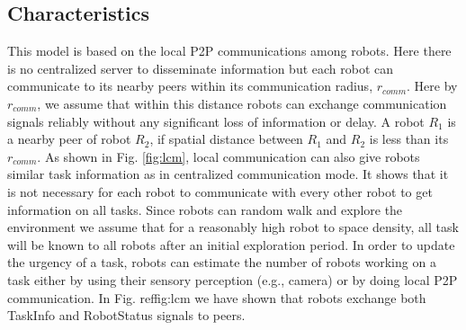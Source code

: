 \documentclass[letterpaper, 10 pt, conference]{ieeeconf}  %
\begin{document}
\subsection{Characteristics}
This model is based on the local P2P communications among robots. Here there is no centralized server to disseminate information but each robot can communicate to its nearby peers within its communication radius, $r_{comm}$. Here by $r_{comm}$, we assume that within this distance robots can exchange communication signals reliably without any significant loss of information or delay. A robot $R_1$ is a nearby peer  of robot $R_2$, if spatial distance between $R_1$ and $R_2$ is less than its $r_{comm}$. As shown in Fig. \ref{fig:lcm}, local communication can also give robots similar task information as in centralized communication mode. It shows that  it is not necessary for each robot to communicate with every other robot to get information on all tasks. Since robots can random walk  and explore the environment we assume that for a reasonably high robot to space density, all task will be known to all robots after an initial exploration period. In order to update the urgency of a task, robots can estimate the number of robots working on a task either by using their sensory perception (e.g., camera)  or by doing local P2P communication. In Fig. ref{fig:lcm} we have shown that robots exchange both TaskInfo and RobotStatus signals to peers.
\end{document}
